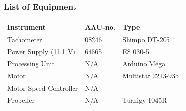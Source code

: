 \subsubsection{List of Equipment}
\begin{table}[H]
	\begin{tabular}{|l|l|p{4.3cm}|}
		\hline%
		\textbf{Instrument}                                  &  \textbf{AAU-no.}  &  \textbf{Type}                       \\
		\hline%
		Tachometer                                           &  08246           &  Shimpo DT-205		                   \\
		\hline%
	    Power Supply (11.1 V) &  64565                   &  ES 030-5                 \\
		\hline%
		Processing Unit                                   &  N/A               & Arduino Mega     \\
		\hline%
		Motor                                   &  N/A               & Multistar 2213-935     \\
		\hline%
		Motor Speed Controller                                   &  N/A               &  -      \\
		\hline%
		Propeller                                   &  N/A               & Turnigy 1045R     \\
		\hline%
		
	\end{tabular}
\end{table}

